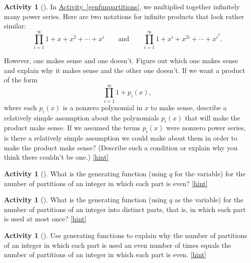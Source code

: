 \documentclass[10pt,]{book}
\theoremstyle{plain}
\theoremstyle{definition}
\theoremstyle{definition}
\theoremstyle{definition}
\newtheorem{activity}[project]{Activity}
\numberwithin{equation}{chapter}
\begin{document}
\begin{activity}[]\label{activity-313}
\hypertarget{p-1591}{}%
In \hyperref[genfunpartitions]{Activity~\ref{genfunpartitions}}, we multiplied together infinitely many power series. Here are two notations for infinite products that look rather similar:%
\begin{equation*}
\prod_{i=1}^\infty 1 + x + x^2 +\cdots+ x^i\qquad\mbox{and}\qquad
\prod_{i=1}^\infty 1 +x^i +x^{2i} +\cdots + x^{i^2}.
\end{equation*}
%
\par
\hypertarget{p-1592}{}%
However, one makes sense and one doesn't. Figure out which one makes sense and explain why it makes sense and the other one doesn't. If we want a product of the form%
\begin{equation*}
\prod_{i=1}^\infty 1 +p_i(x),
\end{equation*}
where each \(p_i(x)\) is a nonzero polynomial in \(x\) to make sense, describe a relatively simple assumption about the polynomials \(p_i(x)\) that will make the product make sense. If we assumed the terms \(p_i(x)\) were nonzero power series, is there a relatively simple assumption we could make about them in order to make the product make sense? (Describe such a condition or explain why you think there couldn't be one.)%
\hfill{\tiny\hyperlink{a-320}{[hint]}\hypertarget{q-320}{}}\end{activity}
\begin{activity}[]\label{activity-314}
\hypertarget{p-1595}{}%
What is the generating function (using \(q\) for the variable) for the number of partitions of an integer in which each part is even?%
\hfill{\tiny\hyperlink{a-321}{[hint]}\hypertarget{q-321}{}}\end{activity}
\begin{activity}[]\label{activity-315}
\hypertarget{p-1598}{}%
What is the generating function (using \(q\) as the variable) for the number of partitions of an integer into distinct parts, that is, in which each part is used at most once?%
\hfill{\tiny\hyperlink{a-322}{[hint]}\hypertarget{q-322}{}}\end{activity}
\begin{activity}[]\label{activity-316}
\hypertarget{p-1601}{}%
Use generating functions to explain why the number of partitions of an integer in which each part is used an even number of times equals the number of partitions of an integer in which each part is even.%
\hfill{\tiny\hyperlink{a-323}{[hint]}\hypertarget{q-323}{}}\end{activity}
\end{document}
